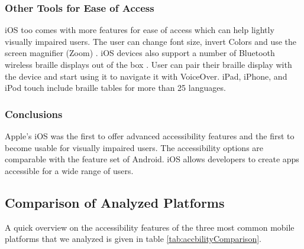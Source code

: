 \subsubsection{Other Tools for Ease of Access}
iOS too comes with more features for ease of access which can help lightly visually impaired users. The user can change font size, invert Colors and use the screen magnifier (Zoom) \cite{iosAccbility}.
iOS devices also support a number of Bluetooth wireless braille displays out of the box \cite{iosAccbility}. User can pair their braille display with the device and start using it to navigate it with VoiceOver. iPad, iPhone, and iPod touch include braille tables for more than 25 languages.

\subsubsection{Conclusions}
Apple's iOS was the first to offer advanced accessibility features and the first to become usable for visually impaired users. The accessibility options are comparable with the  feature set of Android. iOS allows developers to create apps accessible for a wide range of users.

\subsection{Comparison of Analyzed Platforms}
A quick overview on the accessibility features of the three most common mobile platforms that we analyzed is given in table \ref{tab:accbilityComparison}.



